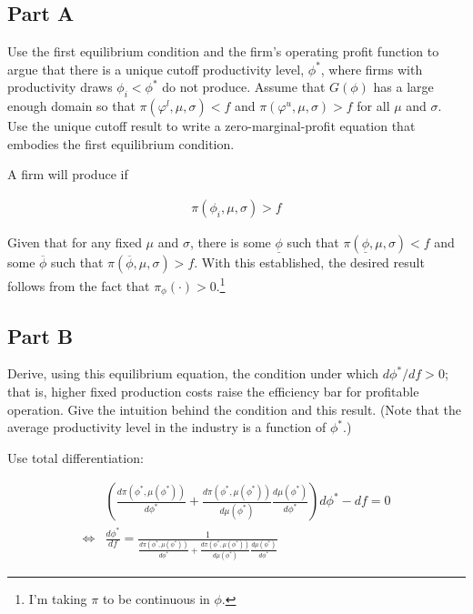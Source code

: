 \documentclass[10pt]{article}
\begin{document}
\subsection{Part A}

Use the first equilibrium condition and the firm's operating profit function to argue that there is a unique cutoff productivity level, $\phi^*$, where firms with productivity draws $\phi_i<\phi^*$ do not produce. Assume that $G(\phi)$ has a large enough domain so that $\pi\left(\varphi^l, \mu, \sigma\right)<f$ and $\pi\left(\varphi^u, \mu, \sigma\right)>f$ for all $\mu$ and $\sigma$. Use the unique cutoff result to write a zero-marginal-profit equation that embodies the first equilibrium condition.

\hrulefill\hspace{0.5em}\dotfill\hspace{0.5em}\hrulefill

A firm will produce if

\begin{align}
    \pi\left(\phi_i, \mu, \sigma\right) > f
\end{align}

Given that for any fixed $\mu$ and $\sigma$, there is some 
$\underline{\phi}$ such that $\pi\left(\underline{\phi}, \mu, \sigma\right) < f$ and
some $\overline{\phi}$ such that $\pi\left(\overline{\phi}, \mu, \sigma\right) > f$.
With this established, the desired result follows 
from the fact that $\pi_{\phi}(\cdot)>0$.\footnote{I'm 
taking $\pi$ to be continuous in $\phi$.}

\subsection{Part B}

Derive, using this equilibrium equation, the condition under which $d \phi^* / d f>0$; that is, higher fixed production costs raise the efficiency bar for profitable operation. Give the intuition behind the condition and this result. (Note that the average productivity level in the industry is a function of $\phi^*$.)

\hrulefill\hspace{0.5em}\dotfill\hspace{0.5em}\hrulefill

Use total differentiation:

\begin{align}
    &\left(\frac{d \pi\left(\phi^*, \mu\left(\phi^*\right)\right)}{d \phi^*}+\frac{d \pi\left(\phi^*, \mu\left(\phi^*\right)\right)}{d \mu\left(\phi^*\right)} \frac{d \mu\left(\phi^*\right)}{d \phi^*}\right) d \phi^*-d f=0 \\
    \Leftrightarrow &\frac{d \phi^*}{d f}=\frac{1}{\frac{d \pi\left(\phi^*, \mu\left(\phi^*\right)\right)}{d \phi^*}+\frac{d \pi\left(\phi^*, \mu\left(\phi^*\right)\right)}{d \mu\left(\phi^*\right)} \frac{d \mu\left(\phi^*\right)}{d \phi^*}}
\end{align}
\end{document}
